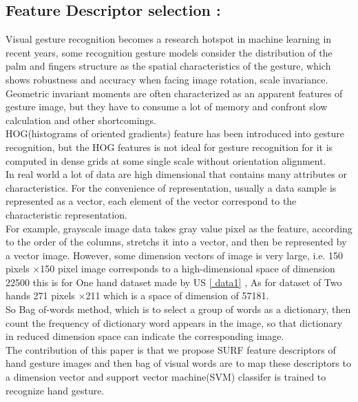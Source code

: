 \subsection{Feature Descriptor selection :}
Visual gesture
recognition becomes a research hotspot in machine learning
in recent years, some recognition gesture models consider the
distribution of the palm and fingers structure as the spatial
characteristics of the gesture, which shows robustness and accuracy
when facing image rotation, scale invariance.\\ Geometric
invariant moments are often characterized as an apparent
features of gesture image, but they have to consume a lot of
memory and confront slow calculation and other shortcomings.\\ HOG(histograms of oriented gradients) feature has been introduced into gesture
recognition, but the HOG features is not ideal for gesture
recognition for it is computed in dense grids at some single
scale without orientation alignment.\\ In real world a lot of data are high dimensional that
contains many attributes or characteristics. For the convenience
of representation, usually a data sample is represented as a
vector, each element of the vector correspond to the characteristic
representation.\\ For example, grayscale image data takes
gray value pixel as the feature, according to the order of the
columns, stretchs it into a vector, and then be represented by
a vector image. However, some dimension vectors of image
is very large, i.e. 150 pixels $\times $150 pixel image corresponds
to a high-dimensional space of dimension 22500 this is for One hand dataset made by US \ref{ data1} , As for dataset of Two hands 271 pixels $\times $211 which is   a  space of dimension  of 57181.\\ So Bag of-words
method, which is to select a group of words as a
dictionary, then count the frequency of dictionary word appears
in the image, so that dictionary in reduced dimension space can
indicate the corresponding image.\\ The contribution of this paper is that we propose SURF
feature descriptors of hand gesture images and then bag of
visual words are to map these descriptors to a dimension vector and support vector machine(SVM) classifer is trained to
recognize hand gesture.

